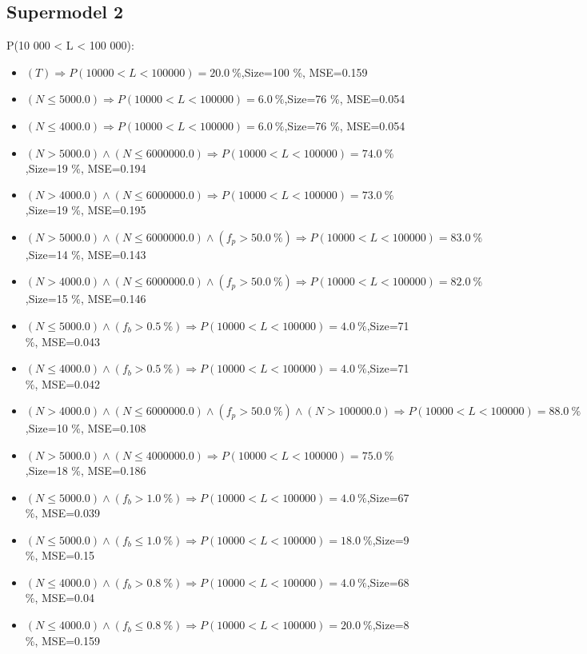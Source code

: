 \documentclass[numbered]{CSL}
\begin{document}
\subsection{Supermodel 2}
P(10 000 < L < 100 000):
\begin{itemize}
\item $(T) \Rightarrow P(10 000 < L < 100 000) = 20.0~\%$,\hfill Size=100 \%, MSE=0.159
\item $(N \leq 5000.0) \Rightarrow P(10 000 < L < 100 000) = 6.0~\%$,\hfill Size=76 \%, MSE=0.054
\item $(N \leq 4000.0) \Rightarrow P(10 000 < L < 100 000) = 6.0~\%$,\hfill Size=76 \%, MSE=0.054
\item $(N > 5000.0) \land (N \leq 6000000.0) \Rightarrow P(10 000 < L < 100 000) = 74.0~\%$,\hfill Size=19 \%, MSE=0.194
\item $(N > 4000.0) \land (N \leq 6000000.0) \Rightarrow P(10 000 < L < 100 000) = 73.0~\%$,\hfill Size=19 \%, MSE=0.195
\item $(N > 5000.0) \land (N \leq 6000000.0) \land (f_p > 50.0~\%) \Rightarrow P(10 000 < L < 100 000) = 83.0~\%$,\hfill Size=14 \%, MSE=0.143
\item $(N > 4000.0) \land (N \leq 6000000.0) \land (f_p > 50.0~\%) \Rightarrow P(10 000 < L < 100 000) = 82.0~\%$,\hfill Size=15 \%, MSE=0.146
\item $(N \leq 5000.0) \land (f_b > 0.5~\%) \Rightarrow P(10 000 < L < 100 000) = 4.0~\%$,\hfill Size=71 \%, MSE=0.043
\item $(N \leq 4000.0) \land (f_b > 0.5~\%) \Rightarrow P(10 000 < L < 100 000) = 4.0~\%$,\hfill Size=71 \%, MSE=0.042
\item $(N > 4000.0) \land (N \leq 6000000.0) \land (f_p > 50.0~\%) \land (N > 100000.0) \Rightarrow P(10 000 < L < 100 000) = 88.0~\%$,\hfill Size=10 \%, MSE=0.108
\item $(N > 5000.0) \land (N \leq 4000000.0) \Rightarrow P(10 000 < L < 100 000) = 75.0~\%$,\hfill Size=18 \%, MSE=0.186
\item $(N \leq 5000.0) \land (f_b > 1.0~\%) \Rightarrow P(10 000 < L < 100 000) = 4.0~\%$,\hfill Size=67 \%, MSE=0.039
\item $(N \leq 5000.0) \land (f_b \leq 1.0~\%) \Rightarrow P(10 000 < L < 100 000) = 18.0~\%$,\hfill Size=9 \%, MSE=0.15
\item $(N \leq 4000.0) \land (f_b > 0.8~\%) \Rightarrow P(10 000 < L < 100 000) = 4.0~\%$,\hfill Size=68 \%, MSE=0.04
\item $(N \leq 4000.0) \land (f_b \leq 0.8~\%) \Rightarrow P(10 000 < L < 100 000) = 20.0~\%$,\hfill Size=8 \%, MSE=0.159

\end{itemize}
\end{document}
